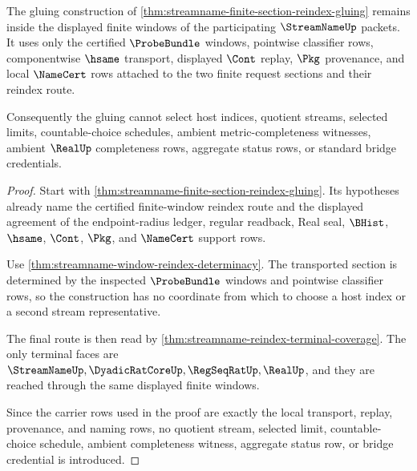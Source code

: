 \begin{theorem}
\label{thm:streamname-finite-section-reindex-gluing-choice-free}
The gluing construction of
\autoref{thm:streamname-finite-section-reindex-gluing} remains inside the
displayed finite windows of the participating $\StreamNameUp$ packets. It uses
only the certified $\ProbeBundle$ windows, pointwise classifier rows,
componentwise $\hsame$ transport, displayed $\Cont$ replay, $\Pkg$
provenance, and local $\NameCert$ rows attached to the two finite request
sections and their reindex route.

Consequently the gluing cannot select host indices, quotient streams, selected
limits, countable-choice schedules, ambient metric-completeness witnesses,
ambient $\RealUp$ completeness rows, aggregate status rows, or standard bridge
credentials.
\end{theorem}
\begin{proof}
Start with
\autoref{thm:streamname-finite-section-reindex-gluing}. Its hypotheses already
name the certified finite-window reindex route and the displayed agreement of
the endpoint-radius ledger, regular readback, Real seal, $\BHist$, $\hsame$,
$\Cont$, $\Pkg$, and $\NameCert$ support rows.

Use \autoref{thm:streamname-window-reindex-determinacy}. The transported
section is determined by the inspected $\ProbeBundle$ windows and pointwise
classifier rows, so the construction has no coordinate from which to choose a
host index or a second stream representative.

The final route is then read by
\autoref{thm:streamname-reindex-terminal-coverage}. The only terminal faces
are $\StreamNameUp,\DyadicRatCoreUp,\RegSeqRatUp,\RealUp$, and they are
reached through the same displayed finite windows.

Since the carrier rows used in the proof are exactly the local transport,
replay, provenance, and naming rows, no quotient stream, selected limit,
countable-choice schedule, ambient completeness witness, aggregate status row,
or bridge credential is introduced.
\end{proof}

